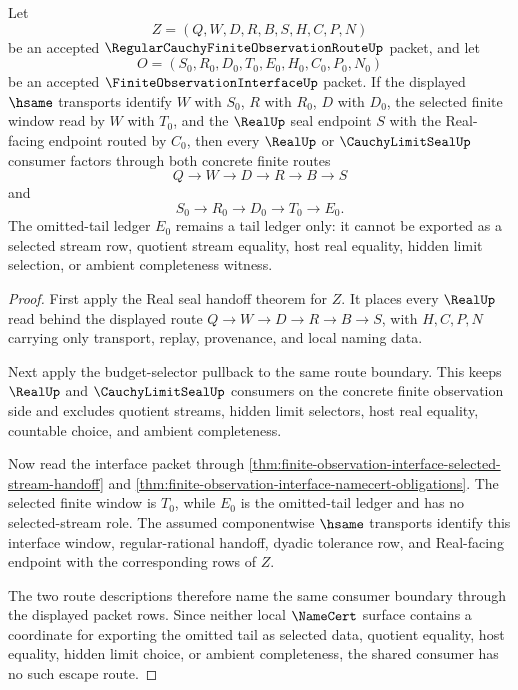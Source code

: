 \begin{theorem}
\label{thm:regular-cauchy-finite-observation-route-interface-lock}
Let
$$
Z=(Q,W,D,R,B,S,H,C,P,N)
$$
be an accepted $\RegularCauchyFiniteObservationRouteUp$ packet, and let
$$
O=(S_0,R_0,D_0,T_0,E_0,H_0,C_0,P_0,N_0)
$$
be an accepted $\FiniteObservationInterfaceUp$ packet. If the displayed $\hsame$ transports identify $W$ with $S_0$, $R$ with $R_0$, $D$ with $D_0$, the selected finite window read by $W$ with $T_0$, and the $\RealUp$ seal endpoint $S$ with the Real-facing endpoint routed by $C_0$, then every $\RealUp$ or $\CauchyLimitSealUp$ consumer factors through both concrete finite routes
$$
Q \to W \to D \to R \to B \to S
$$
and
$$
S_0 \to R_0 \to D_0 \to T_0 \to E_0 .
$$
The omitted-tail ledger $E_0$ remains a tail ledger only: it cannot be exported as a selected stream row, quotient stream equality, host real equality, hidden limit selection, or ambient completeness witness.
\end{theorem}
\begin{proof}
First apply the Real seal handoff theorem for $Z$. It places every $\RealUp$ read behind the displayed route $Q \to W \to D \to R \to B \to S$, with $H,C,P,N$ carrying only transport, replay, provenance, and local naming data.

Next apply the budget-selector pullback to the same route boundary. This keeps $\RealUp$ and $\CauchyLimitSealUp$ consumers on the concrete finite observation side and excludes quotient streams, hidden limit selectors, host real equality, countable choice, and ambient completeness.

Now read the interface packet through \autoref{thm:finite-observation-interface-selected-stream-handoff} and \autoref{thm:finite-observation-interface-namecert-obligations}. The selected finite window is $T_0$, while $E_0$ is the omitted-tail ledger and has no selected-stream role. The assumed componentwise $\hsame$ transports identify this interface window, regular-rational handoff, dyadic tolerance row, and Real-facing endpoint with the corresponding rows of $Z$.

The two route descriptions therefore name the same consumer boundary through the displayed packet rows. Since neither local $\NameCert$ surface contains a coordinate for exporting the omitted tail as selected data, quotient equality, host equality, hidden limit choice, or ambient completeness, the shared consumer has no such escape route.
\end{proof}

